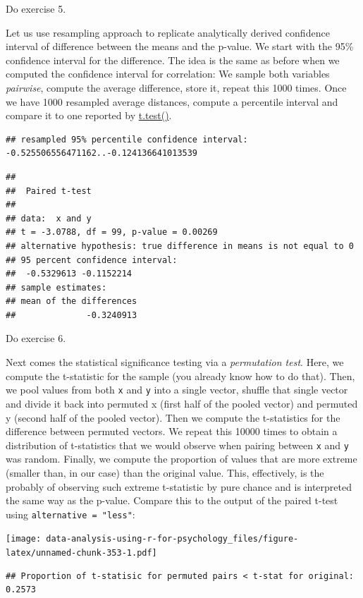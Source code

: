 \documentclass[
]{book}
\begin{document}
Do exercise 5.

Let us use resampling approach to replicate analytically derived confidence interval of difference between the means and the p-value. We start with the 95\% confidence interval for the difference. The idea is the same as before when we computed the confidence interval for correlation: We sample both variables \emph{pairwise}, compute the average difference, store it, repeat this 1000 times. Once we have 1000 resampled average distances, compute a percentile interval and compare it to one reported by \href{https://stat.ethz.ch/R-manual/R-devel/library/stats/html/t.test.html}{t.test()}.

\begin{verbatim}
## resampled 95% percentile confidence interval: -0.525506556471162..-0.124136641013539
\end{verbatim}

\begin{verbatim}
## 
##  Paired t-test
## 
## data:  x and y
## t = -3.0788, df = 99, p-value = 0.00269
## alternative hypothesis: true difference in means is not equal to 0
## 95 percent confidence interval:
##  -0.5329613 -0.1152214
## sample estimates:
## mean of the differences 
##              -0.3240913
\end{verbatim}

Do exercise 6.

Next comes the statistical significance testing via a \emph{permutation test}. Here, we compute the t-statistic for the sample (you already know how to do that). Then, we pool values from both \texttt{x} and \texttt{y} into a single vector, shuffle that single vector and divide it back into permuted x (first half of the pooled vector) and permuted y (second half of the pooled vector). Then we compute the t-statistics for the difference between permuted vectors. We repeat this 10000 times to obtain a distribution of t-statistics that we would observe when pairing between \texttt{x} and \texttt{y} was random. Finally, we compute the proportion of values that are more extreme (smaller than, in our case) than the original value. This, effectively, is the probably of observing such extreme t-statistic by pure chance and is interpreted the same way as the p-value. Compare this to the output of the paired t-test using \texttt{alternative\ =\ "less"}:

\texttt{[image: data-analysis-using-r-for-psychology\_files/figure-latex/unnamed-chunk-353-1.pdf]}

\begin{verbatim}
## Proportion of t-statisic for permuted pairs < t-stat for original: 0.2573
\end{verbatim}
\end{document}
